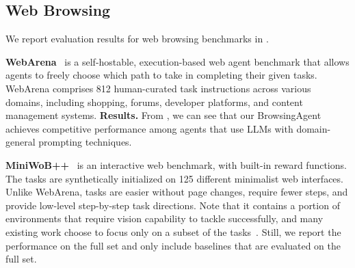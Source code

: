 \subsection{Web Browsing}
\label{sec:eval_browsing}

We report evaluation results for web browsing benchmarks in .

\textbf{WebArena}~\citep{zhou2023webarena} is a self-hostable, execution-based web agent benchmark that allows agents to freely choose which path to take in completing their given tasks. 
WebArena comprises 812 human-curated task instructions across various domains, including shopping, forums, developer platforms, and content management systems. 
\textbf{Results.} From , we can see that our BrowsingAgent achieves competitive performance among agents that use LLMs with domain-general prompting techniques.

\textbf{MiniWoB++}~\citep{liu2018reinforcement} is an interactive web benchmark, with built-in reward functions.
The tasks are synthetically initialized on 125 different minimalist web interfaces.
Unlike WebArena, tasks are easier without page changes, require fewer steps, and provide low-level step-by-step task directions.
Note that it contains a portion of environments that require vision capability to tackle successfully, and many existing work choose to focus only on a subset of the tasks~\citep{kim2024language,li2023zero,shaw2023pixels}. Still, we report the performance on the full set and only include baselines that are evaluated on the full set.


